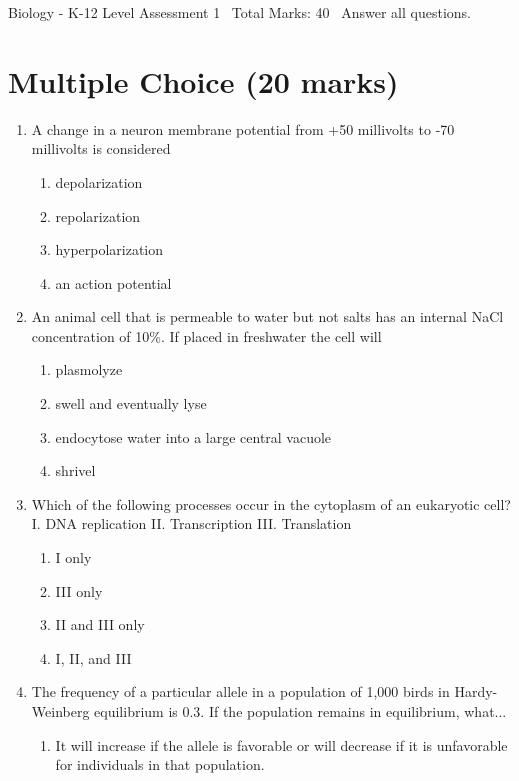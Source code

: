 \documentclass[12pt]{article}
\begin{document}
\begin{center}
Biology - K-12 Level Assessment 1 \
Total Marks: 40 \
Answer all questions.
\end{center}

\section*{Multiple Choice (20 marks)}
\begin{enumerate}[label=\arabic*.]
\item A change in a neuron membrane potential from +50 millivolts to -70 millivolts is considered
\begin{enumerate}[label=(\alph*)]
    \item depolarization
    \item repolarization
    \item hyperpolarization
    \item an action potential
\end{enumerate}
\item An animal cell that is permeable to water but not salts has an internal NaCl concentration of 10\%. If placed in freshwater the cell will
\begin{enumerate}[label=(\alph*)]
    \item plasmolyze
    \item swell and eventually lyse
    \item endocytose water into a large central vacuole
    \item shrivel
\end{enumerate}
\item Which of the following processes occur in the cytoplasm of an eukaryotic cell? I. DNA replication II. Transcription III. Translation
\begin{enumerate}[label=(\alph*)]
    \item I only
    \item III only
    \item II and III only
    \item I, II, and III
\end{enumerate}
\item The frequency of a particular allele in a population of 1,000 birds in Hardy-Weinberg equilibrium is 0.3. If the population remains in equilibrium, what...
\begin{enumerate}[label=(\alph*)]
    \item It will increase if the allele is favorable or will decrease if it is unfavorable for individuals in that population.

\end{enumerate}
\end{enumerate}
\end{document}

